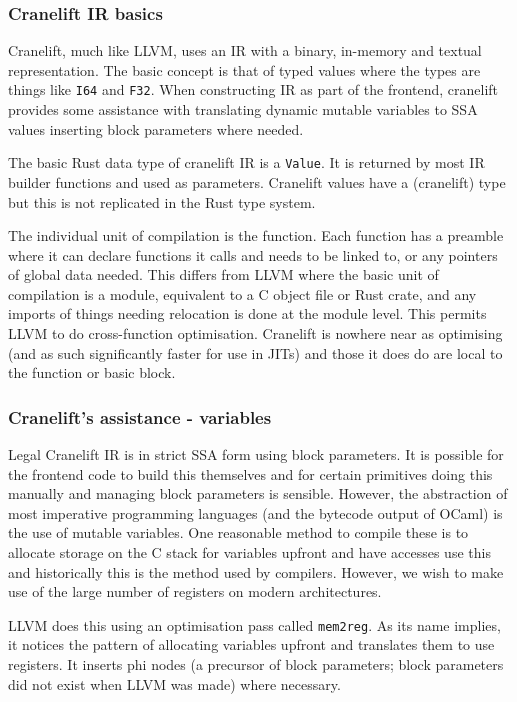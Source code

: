 \subsubsection{Cranelift IR basics}

Cranelift, much like LLVM, uses an IR with a binary, in-memory and textual representation. The
basic concept is that of typed values where the types are things like \texttt{I64} and
\texttt{F32}. When constructing IR as part of the frontend, cranelift provides some assistance with
translating dynamic mutable variables to SSA values inserting block parameters where needed.

The basic Rust data type of cranelift IR is a \texttt{Value}. It is returned by most IR builder
functions and used as parameters. Cranelift values have a (cranelift) type but this is not
replicated in the Rust type system.

The individual unit of compilation is the function. Each function has a preamble where it can
declare functions it calls and needs to be linked to, or any pointers of global data needed. This
differs from LLVM where the basic unit of compilation is a module, equivalent to a C object file or
Rust crate, and any imports of things needing relocation is done at the module level. This permits
LLVM to do cross-function optimisation. Cranelift is nowhere near as optimising (and as such
significantly faster for use in JITs) and those it does do are local to the function or basic
block.

\subsubsection{Cranelift's assistance - variables}

Legal Cranelift IR is in strict SSA form using block parameters. It is possible for the frontend
code to build this themselves and for certain primitives doing this manually and managing block
parameters is sensible. However, the abstraction of most imperative programming languages (and the
bytecode output of OCaml) is the use of mutable variables. One reasonable method to compile these
is to allocate storage on the C stack for variables upfront and have accesses use this and
historically this is the method used by compilers. However, we wish to make use of the large number
of registers on modern architectures.

LLVM does this using an optimisation pass called \texttt{mem2reg}. As its name implies, it notices
the pattern of allocating variables upfront and translates them to use registers. It inserts phi
nodes (a precursor of block parameters; block parameters did not exist when LLVM was made) where
necessary.

